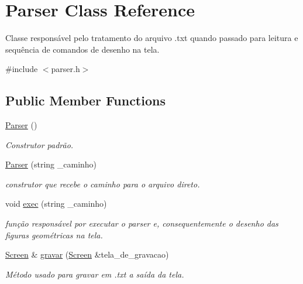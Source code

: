 \hypertarget{class_parser}{}\section{Parser Class Reference}
\label{class_parser}


Classe responsável pelo tratamento do arquivo .txt quando passado para leitura e sequência de comandos de desenho na tela.  




{\ttfamily \#include $<$parser.\+h$>$}

\subsection*{Public Member Functions}
\begin{DoxyCompactItemize}
\item 
\mbox{\label{class_parser_a12234f6cd36b61af4b50c94a179422c1}} 
\hyperlink{class_parser_a12234f6cd36b61af4b50c94a179422c1}{Parser} ()
\begin{DoxyCompactList}\small\item\em Construtor padrão. \end{DoxyCompactList}\item 
\mbox{\label{class_parser_a32d2e7664c2a3c19845a710f61ff48eb}} 
\hyperlink{class_parser_a32d2e7664c2a3c19845a710f61ff48eb}{Parser} (string \+\_\+caminho)
\begin{DoxyCompactList}\small\item\em construtor que recebe o caminho para o arquivo direto. \end{DoxyCompactList}\item 
\mbox{\label{class_parser_ad85771aa868c4a9c0614efbac5024d05}} 
void \hyperlink{class_parser_ad85771aa868c4a9c0614efbac5024d05}{exec} (string \+\_\+caminho)
\begin{DoxyCompactList}\small\item\em função responsável por executar o parser e, consequentemente o desenho das figuras geométricas na tela. \end{DoxyCompactList}\item 
\mbox{\label{class_parser_ad077716f92e597d13e7098839e2dda9f}} 
\hyperlink{class_screen}{Screen} \& \hyperlink{class_parser_ad077716f92e597d13e7098839e2dda9f}{gravar} (\hyperlink{class_screen}{Screen} \&tela\+\_\+de\+\_\+gravacao)
\begin{DoxyCompactList}\small\item\em Método usado para gravar em .txt a saída da tela. \end{DoxyCompactList}\end{DoxyCompactItemize}


